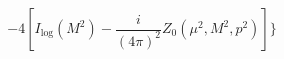 \begin{equation}
-4[I_{\log }(M^{2})-\frac{i}{(4\pi )^{2}}Z_{0}(\mu ^{2},M^{2},p^{2})]\}
\label{z}
\end{equation}

